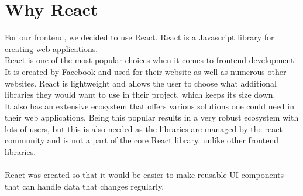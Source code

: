\section{Why React}
For our frontend, we decided to use React.
React is a Javascript library for creating web applications\cite{ReactJS}. 
\\
React is one of the most popular choices when it comes to frontend development\cite{NPMVueReactAngular}.
It is created by Facebook and used for their website as well as numerous other websites\cite{ReactHistory}.
React is lightweight and allows the user to choose what additional libraries they would want to use in their project, which keeps its size down.
\\
It also has an extensive ecosystem that offers various solutions one could need in their web applications.
Being this popular results in a very robust ecosystem with lots of users, but this is also needed as the libraries are managed by the react community and is not a part of the core React library, unlike other frontend libraries\cite{Vue}.
\\\\
React was created so that it would be easier to make reusable UI components that can handle data that changes regularly\cite{ReactHistory}.